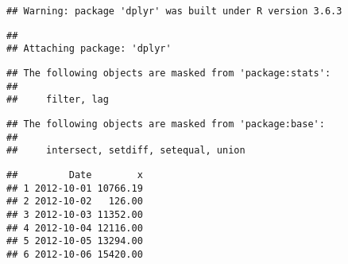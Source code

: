\documentclass[
]{article}
\newenvironment{Shaded}{\begin{snugshade}}{\end{snugshade}}
\newcommand{\CommentTok}[1]{\textcolor[rgb]{0.56,0.35,0.01}{\textit{#1}}}
\newcommand{\ControlFlowTok}[1]{\textcolor[rgb]{0.13,0.29,0.53}{\textbf{#1}}}
\newcommand{\DataTypeTok}[1]{\textcolor[rgb]{0.13,0.29,0.53}{#1}}
\newcommand{\DecValTok}[1]{\textcolor[rgb]{0.00,0.00,0.81}{#1}}
\newcommand{\KeywordTok}[1]{\textcolor[rgb]{0.13,0.29,0.53}{\textbf{#1}}}
\newcommand{\NormalTok}[1]{#1}
\newcommand{\OperatorTok}[1]{\textcolor[rgb]{0.81,0.36,0.00}{\textbf{#1}}}
\newcommand{\OtherTok}[1]{\textcolor[rgb]{0.56,0.35,0.01}{#1}}
\newcommand{\StringTok}[1]{\textcolor[rgb]{0.31,0.60,0.02}{#1}}
\begin{document}
\begin{verbatim}
## Warning: package 'dplyr' was built under R version 3.6.3
\end{verbatim}

\begin{verbatim}
## 
## Attaching package: 'dplyr'
\end{verbatim}

\begin{verbatim}
## The following objects are masked from 'package:stats':
## 
##     filter, lag
\end{verbatim}

\begin{verbatim}
## The following objects are masked from 'package:base':
## 
##     intersect, setdiff, setequal, union
\end{verbatim}

\begin{Shaded}
\end{Shaded}

\begin{verbatim}
##         Date        x
## 1 2012-10-01 10766.19
## 2 2012-10-02   126.00
## 3 2012-10-03 11352.00
## 4 2012-10-04 12116.00
## 5 2012-10-05 13294.00
## 6 2012-10-06 15420.00
\end{verbatim}

\begin{Shaded}
\end{Shaded}
\end{document}
